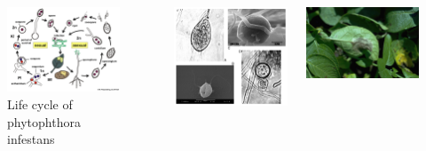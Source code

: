 \documentclass[10pt,dvipsnames,ignorenonframetext,aspectratio=169]{beamer}
\newcommand{\bcolumns}{\begin{columns}[T, onlytextwidth]}
\newcommand{\ecolumns}{\end{columns}}
\begin{document}
\begin{frame}{}
\protect\hypertarget{section-4}{}
\bcolumns
{}

\begin{figure}
\includegraphics[width=0.9\linewidth]{../images/Phytophthora_infestans_on_potato} \caption{Life cycle of phytophthora infestans}\label{fig:phytophthora-infestans-life-cycle}
\end{figure}


\includegraphics[width=0.8\linewidth]{../images/Phytophtora_reproduction}

\includegraphics[width=0.8\linewidth]{../images/Late_blight_on_potato_leaf}

\ecolumns
\end{frame}
\end{document}

